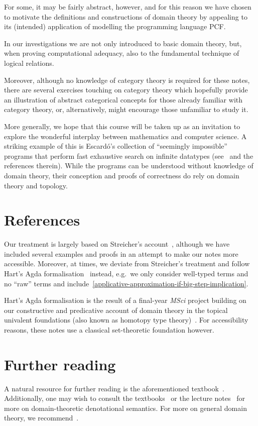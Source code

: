 For some, it may be fairly abstract, however, and for this reason we have chosen
to motivate the definitions and constructions of domain theory by appealing to
its (intended) application of modelling the programming language PCF.

In our investigations we are not only introduced to basic domain theory, but,
when proving computational adequacy, also to the fundamental technique of
logical relations.

Moreover, although no knowledge of category theory is required for these notes,
there are several exercises touching on category theory which hopefully provide
an illustration of abstract categorical concepts for those already familiar with
category theory, or, alternatively, might encourage those unfamiliar to study it.

More generally, we hope that this course will be taken up as an invitation to
explore the wonderful interplay between mathematics and computer science.
%
A striking example of this is Escard\'o's collection of ``seemingly impossible''
programs that perform fast exhaustive search on infinite datatypes
(see~\cite{Escardo2007b} and the references therein).
%
While the programs can be understood without knowledge of domain theory, their
conception and proofs of correctness do rely on domain theory and topology.

\section{References}

Our treatment is largely based on Streicher's account~\cite{Streicher2006},
although we have included several examples and proofs in an attempt to make our
notes more accessible.
%
Moreover, at times, we deviate from Streicher's treatment and follow Hart's Agda
formalisation~\cite{Hart2020} instead, e.g.\ we only consider well-typed terms
and no ``raw'' terms and
include~\cref{applicative-approximation-if-big-step-implication}.

Hart's Agda formalisation is the result of a final-year \emph{MSci} project
building on our constructive and predicative account of domain theory in the
topical univalent foundations (also known as homotopy type
theory)~\cite{deJong2022}. For accessibility reasons, these notes use a
classical set-theoretic foundation however.

\section{Further reading}

A natural resource for further reading is the aforementioned
textbook~\cite{Streicher2006}.
%
Additionally, one may wish to consult the
textbooks~\cite{Winskel1993,Gunther1992} or the lecture
notes~\cite{Plotkin1983,PittsWinskelFiore2012} for more on domain-theoretic denotational
semantics.
%
For more on general domain theory, we
recommend~\cite{AbramskyJung1994,GierzEtAl2003}.


